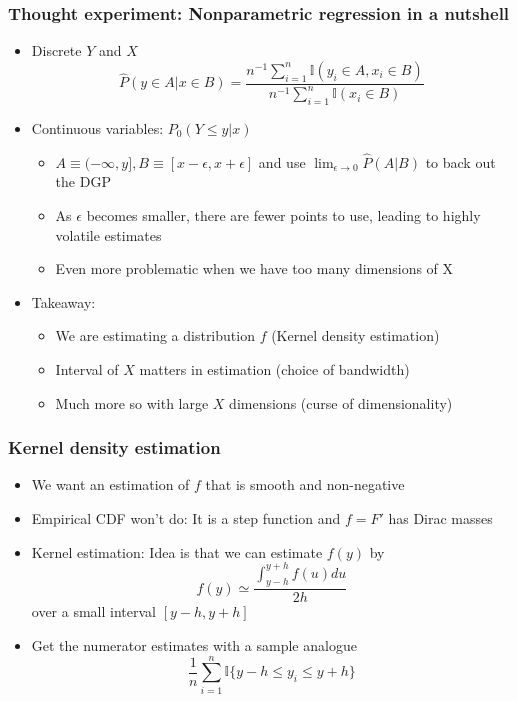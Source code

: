 \documentclass[aspectratio=169]{beamer}
\begin{document}
\begin{frame}
\frametitle{Thought experiment: Nonparametric regression in a nutshell}
\begin{itemize}
\item Discrete $Y$ and $X$
\[
\widehat{P}(y\in A| x\in B)=\frac{n^{-1}\sum_{i=1}^n\mathbb{I}(y_i\in A, x_i\in B) }{n^{-1}\sum_{i=1}^n\mathbb{I}(x_i\in B)}
\]
\item Continuous variables:  $P_0(Y\leq y|x)$
\begin{itemize}
\item $A\equiv (-\infty, y], B\equiv[x-\epsilon, x+\epsilon]$ and use $\lim_{\epsilon\to0}\widehat{P}(A|B)$ to back out the DGP
\item As $\epsilon$ becomes smaller, there are fewer points to use, leading to highly volatile estimates
\item Even more problematic when we have too many dimensions of X
\end{itemize}
\item Takeaway: 
\begin{itemize}
\item We are estimating a distribution $f$ (Kernel density estimation)
\item Interval of $X$ matters in estimation (choice of bandwidth)
\item Much more so with large $X$ dimensions (curse of dimensionality)
\end{itemize}
\end{itemize}
\end{frame}

\begin{frame}
\frametitle{Kernel density estimation}
\begin{itemize}
\item We want an estimation of $f$ that is smooth and non-negative
\item Empirical CDF won't do: It is a step function and $f=F'$ has Dirac masses
\item Kernel estimation: Idea is that we can estimate $f(y)$ by
\[
f(y)\simeq \frac{\int^{y+h}_{y-h} f(u)du}{2h}
\]
over a small interval $[y-h, y+h]$
\item Get the numerator estimates with a sample analogue
\[
\frac{1}{n}\sum_{i=1}^n \mathbb{I}\{y-h\leq y_i \leq y+h \}
\]
\end{itemize}
\end{frame}
\end{document}
